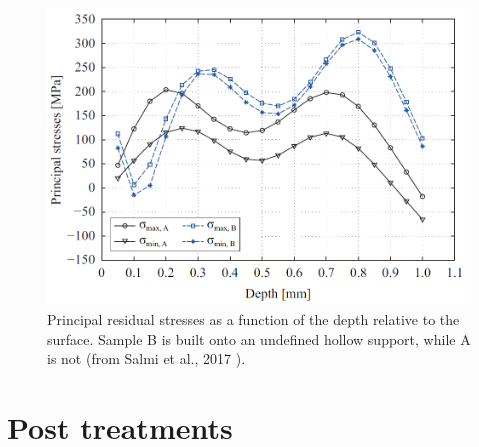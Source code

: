 \begin{figure}[ht]
	\centering
	\includegraphics[scale=0.50]{Images/Rs-support}
	\decoRule
	\caption[Principal residual stresses as a function of the depth relative to the surface. Sample B is built onto an undefined hollow support, while A is not]{Principal residual stresses as a function of the depth relative to the surface. Sample B is built onto an undefined hollow support, while A is not (from Salmi et al., 2017 \parencite{Salmi2017}).}
	\label{fig:rs_support}
\end{figure}

\section{Post treatments}
\label{SOTAPT}
%
%
%
%
%
%
%
%

